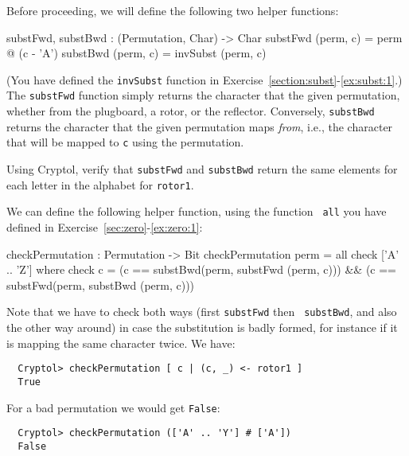 Before proceeding, we will define the following two helper functions:
\begin{code}
  substFwd, substBwd : (Permutation, Char) -> Char
  substFwd (perm, c) = perm @ (c - 'A')
  substBwd (perm, c) = invSubst (perm, c)
\end{code}
(You have defined the {\tt invSubst} function in
Exercise~\ref{section:subst}-\ref{ex:subst:1}.) The {\tt substFwd}
function simply returns the character that the given permutation,
whether from the plugboard, a rotor, or the reflector. Conversely,
{\tt substBwd} returns the character that the given permutation maps
{\em from}, i.e., the character that will be mapped to {\tt c} using
the permutation.

\begin{Exercise}\label{ex:enigma:7}
  Using Cryptol, verify that {\tt substFwd} and {\tt substBwd} return
  the same elements for each letter in the alphabet for {\tt rotor1}.
\end{Exercise}
\begin{Answer}
  We can define the following helper function, using the function {\tt
    all} you have defined in
  Exercise~\ref{sec:zero}-\ref{ex:zero:1}:\indAll
\begin{code}
  checkPermutation : Permutation -> Bit
  checkPermutation perm = all check  ['A' .. 'Z']
    where check  c = (c == substBwd(perm, substFwd (perm, c))) 
                  && (c == substFwd(perm, substBwd (perm, c)))
\end{code}
Note that we have to check both ways (first {\tt substFwd} then {\tt
  substBwd}, and also the other way around) in case the substitution
is badly formed, for instance if it is mapping the same character
twice. We have:
\begin{Verbatim}
  Cryptol> checkPermutation [ c | (c, _) <- rotor1 ]
  True
\end{Verbatim}
For a bad permutation we would get {\tt False}:
\begin{Verbatim}
  Cryptol> checkPermutation (['A' .. 'Y'] # ['A'])
  False
\end{Verbatim}
\end{Answer}

